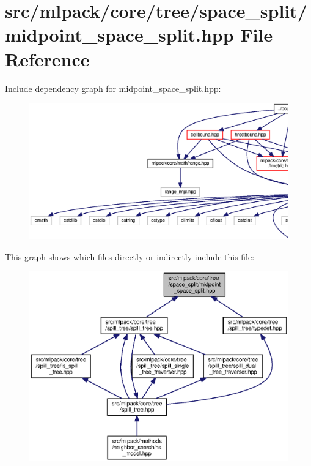 \section{src/mlpack/core/tree/space\+\_\+split/midpoint\+\_\+space\+\_\+split.hpp File Reference}
\label{midpoint__space__split_8hpp}
Include dependency graph for midpoint\+\_\+space\+\_\+split.\+hpp\+:
\nopagebreak
\begin{figure}[H]
\begin{center}
\leavevmode
\includegraphics[width=350pt]{midpoint__space__split_8hpp__incl}
\end{center}
\end{figure}
This graph shows which files directly or indirectly include this file\+:
\nopagebreak
\begin{figure}[H]
\begin{center}
\leavevmode
\includegraphics[width=350pt]{midpoint__space__split_8hpp__dep__incl}
\end{center}
\end{figure}
